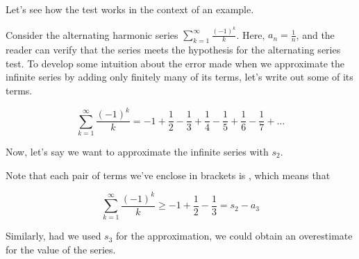 \documentclass{ximera}
\begin{document}
Let's see how the test works in the context of an example.

\begin{model}
Consider the alternating harmonic series $\sum_{k=1}^{\infty} \frac{(-1)^k}{k}$.  Here, $a_n = \frac{1}{n}$, and the reader can verify that the series meets the hypothesis for the alternating series test.  To develop some intuition about the error made when we approximate the infinite series by adding only finitely many of its terms, let's write out some of its terms.

\[
\sum_{k=1}^{\infty} \frac{(-1)^k}{k} = -1+\frac{1}{2}-\frac{1}{3}+\frac{1}{4}-\frac{1}{5}+\frac{1}{6}-\frac{1}{7} + \ldots
\]

Now, let's say we want to approximate the infinite series with $s_2$.

\begin{image}
  \end{image}
  
  Note that each pair of terms we've enclose in brackets is , which means that
  
  \[
  \sum_{k=1}^{\infty} \frac{(-1)^k}{k} \geq -1+\frac{1}{2}-\frac{1}{3} = s_2 -a_3
  \]
  
  Similarly, had we used $s_3$ for the approximation, we could obtain an overestimate for the value of the series.
  
  \begin{image}
  \end{image}
  

\end{model}
\end{document}
